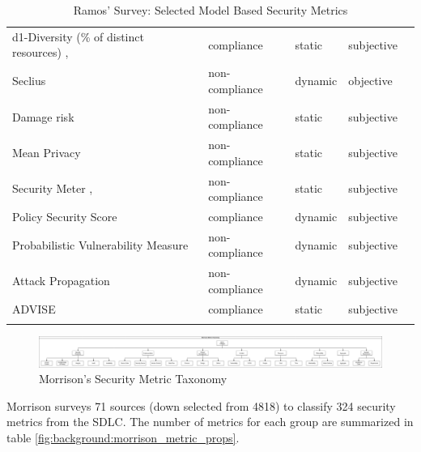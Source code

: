 \begin{tiny}
\begin{longtable}{@{}lllll@{}}
d1-Diversity (\% of distinct resources) \cite{Zhang_Wang_Jajodia_Singhal_Albanese_2016}, \cite{Wang_Zhang_Jajodia_Singhal_Albanese_2014} & compliance & static & subjective &  \\
Seclius \cite{Zonouz_Berthier_Khurana_Sanders_Yardley_2015} & non-compliance & dynamic & objective &  \\
Damage risk \cite{Chatzipoulidis_Michalopoulos_Mavridis_2015} & non-compliance & static & subjective &  \\
Mean Privacy \cite{Almasizadeh_Azgomi_2013a} & non-compliance & static & subjective &  \\
Security Meter \cite{Sahinoglu_2005}, \cite{Sahinoglu_2008} & non-compliance & static & subjective &  \\
Policy Security Score \cite{Abedin_Nessa_Al-Shaer_Khan_2006} & compliance & dynamic & subjective &  \\
Probabilistic Vulnerability Measure \cite{Ahmed_Al-Shaer_Khan_2008} & non-compliance & dynamic & subjective &  \\
Attack Propagation \cite{Ahmed_Al-Shaer_Taibah_Khan_2011} & non-compliance & dynamic & subjective &  \\
ADVISE \cite{LeMay_Ford_Keefe_Sanders_Muehrcke_2011} & compliance & static & subjective &  \\* \bottomrule
\caption{Ramos' Survey: Selected Model Based Security Metrics\cite{Ramos_Lazar_Filho_Rodrigues_2017}}
\label{tab:ramos_metrics}\\
\end{longtable}
\end{tiny}


\begin{figure}[ht]
\centering
\includegraphics[width=.95\linewidth]{resource/img/ch_background/cybok_metrics/morrison_taxonomy.png}
\caption{Morrison's Security Metric Taxonomy\cite{Morrison_Moye_Pandita_Williams_2018}
\label{fig:background:morrison_taxonomy}}
\end{figure} 

Morrison surveys 71 sources (down selected from 4818) to classify 324 security metrics from the SDLC. The number of metrics for each group are summarized in table \ref{fig:background:morrison_metric_props}.


